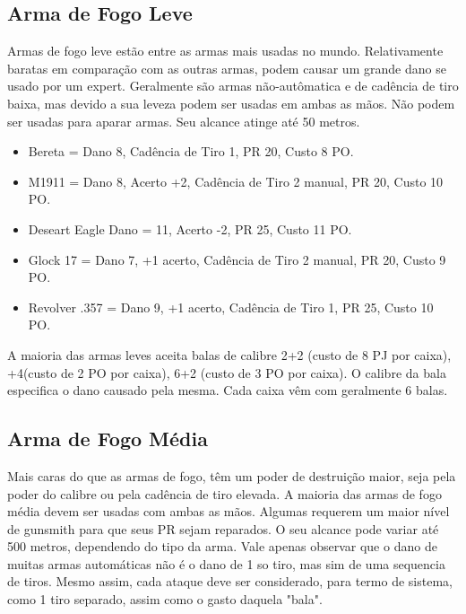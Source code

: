 \subsection{Arma de Fogo Leve}
Armas de fogo leve estão entre as armas mais usadas no mundo. Relativamente baratas em comparação com as outras armas, podem causar um grande dano se usado por um expert. Geralmente são armas não-autômatica e de cadência de tiro baixa, mas devido a sua leveza podem ser usadas em ambas as mãos. Não podem ser usadas para aparar armas. Seu alcance atinge até 50 metros.

\begin{itemize}
	\item Bereta = Dano 8, Cadência de Tiro 1, PR 20, Custo 8 PO.
	\item M1911 = Dano 8, Acerto +2, Cadência de Tiro 2 manual, PR 20, Custo 10 PO.
	\item Deseart Eagle Dano = 11, Acerto -2, PR 25, Custo 11 PO.
	\item Glock 17 = Dano 7, +1 acerto, Cadência de Tiro 2 manual, PR 20, Custo 9 PO.
	\item Revolver .357 = Dano 9, +1 acerto, Cadência de Tiro 1, PR 25, Custo 10 PO.
\end{itemize}

A maioria das armas leves aceita balas de calibre 2+2 (custo de 8 PJ por caixa), +4(custo de 2 PO por caixa), 6+2 (custo de 3 PO por caixa). O calibre da bala especifica o dano causado pela mesma. Cada caixa vêm com geralmente 6 balas. 

\subsection{Arma de Fogo Média}
Mais caras do que as armas de fogo, têm um poder de destruição maior, seja pela poder do calibre ou pela cadência de tiro elevada. A maioria das armas de fogo média devem ser usadas com ambas as mãos. Algumas requerem um maior nível de gunsmith para que seus PR sejam reparados. O seu alcance pode variar até 500 metros, dependendo do tipo da arma. Vale apenas observar que o dano de muitas armas automáticas não é o dano de 1 so tiro, mas sim de uma sequencia de tiros. Mesmo assim, cada ataque deve ser considerado, para termo de sistema, como 1 tiro separado, assim como o gasto daquela "bala".

